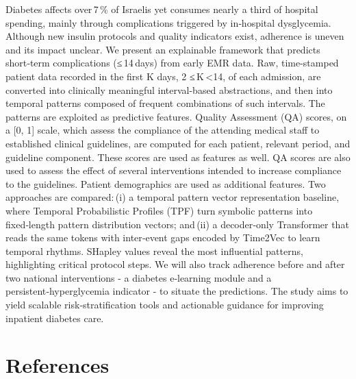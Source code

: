 \documentclass[
]{article}
\begin{document}
Diabetes affects over\,7\,\% of Israelis yet consumes nearly a third of
hospital spending, mainly through complications triggered by in‑hospital
dysglycemia. Although new insulin protocols and quality indicators
exist, adherence is uneven and its impact unclear. We present an
explainable framework that predicts short‑term complications
(≤\,14\,days) from early EMR data. Raw, time-stamped patient data
recorded in the first K days, 2 ≤\,K\,\textless14, of each admission,
are converted into clinically meaningful interval-based abstractions,
and then into temporal patterns composed of frequent combinations of
such intervals. The patterns are exploited as predictive features.
Quality Assessment (QA) scores, on a {[}0, 1{]} scale, which assess the
compliance of the attending medical staff to established clinical
guidelines, are computed for each patient, relevant period, and
guideline component. These scores are used as features as well. QA
scores are also used to assess the effect of several interventions
intended to increase compliance to the guidelines. Patient demographics
are used as additional features. Two approaches are compared:\,(i) a
temporal pattern vector representation baseline, where Temporal
Probabilistic Profiles (TPF) turn symbolic patterns into fixed‑length
pattern distribution vectors; and\,(ii) a decoder‑only Transformer that
reads the same tokens with inter‑event gaps encoded by Time2Vec to learn
temporal rhythms. SHapley values reveal the most influential patterns,
highlighting critical protocol steps. We will also track adherence
before and after two national interventions - a diabetes e‑learning
module and a persistent‑hyperglycemia indicator - to situate the
predictions. The study aims to yield scalable risk‑stratification tools
and actionable guidance for improving inpatient diabetes care.

\section{References}\label{references}
\end{document}
